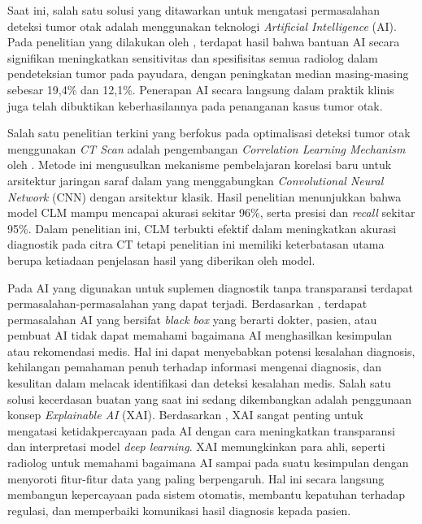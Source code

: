Saat ini, salah satu solusi yang ditawarkan untuk mengatasi permasalahan deteksi tumor otak adalah menggunakan teknologi \textit{Artificial Intelligence} (AI). Pada penelitian yang dilakukan oleh \textcite{darmiati2023impact}, terdapat hasil bahwa bantuan AI secara signifikan meningkatkan sensitivitas dan spesifisitas semua radiolog dalam pendeteksian tumor pada payudara, dengan peningkatan median masing-masing sebesar 19,4\% dan 12,1\%. Penerapan AI secara langsung dalam praktik klinis juga telah dibuktikan keberhasilannya pada penanganan kasus tumor otak.

Salah satu penelitian terkini yang berfokus pada optimalisasi deteksi tumor otak menggunakan \textit{CT Scan} adalah pengembangan \textit{Correlation Learning Mechanism} oleh \textcite{wozniak2021deep}. Metode ini mengusulkan mekanisme pembelajaran korelasi baru untuk arsitektur jaringan saraf dalam yang menggabungkan \textit{Convolutional Neural Network} (CNN) dengan arsitektur klasik. Hasil penelitian menunjukkan bahwa model CLM mampu mencapai akurasi sekitar 96\%, serta presisi dan \textit{recall} sekitar 95\%. Dalam penelitian ini, CLM terbukti efektif dalam meningkatkan akurasi diagnostik pada citra CT tetapi penelitian ini memiliki keterbatasan utama berupa ketiadaan penjelasan hasil yang diberikan oleh model.

Pada AI yang digunakan untuk suplemen diagnostik tanpa transparansi terdapat permasalahan-permasalahan yang dapat terjadi. Berdasarkan \textcite{xu2023medical}, terdapat permasalahan AI yang bersifat \textit{black box} yang berarti dokter, pasien, atau pembuat AI tidak dapat memahami bagaimana AI menghasilkan kesimpulan atau rekomendasi medis. Hal ini dapat menyebabkan potensi kesalahan diagnosis, kehilangan pemahaman penuh terhadap informasi mengenai diagnosis, dan kesulitan dalam melacak identifikasi dan deteksi kesalahan medis. Salah satu solusi kecerdasan buatan yang saat ini sedang dikembangkan adalah penggunaan konsep \textit{Explainable AI} (XAI). Berdasarkan \textcite{asmita2025from}, XAI sangat penting untuk mengatasi ketidakpercayaan pada AI dengan cara meningkatkan transparansi dan interpretasi model \textit{deep learning}. XAI memungkinkan para ahli, seperti radiolog untuk memahami bagaimana AI sampai pada suatu kesimpulan dengan menyoroti fitur-fitur data yang paling berpengaruh. Hal ini secara langsung membangun kepercayaan pada sistem otomatis, membantu kepatuhan terhadap regulasi, dan memperbaiki komunikasi hasil diagnosis kepada pasien.

